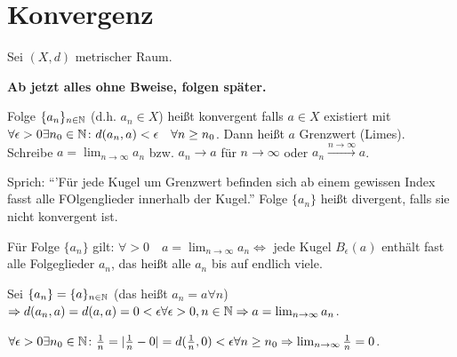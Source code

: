 \chapter{Konvergenz}
Sei $(X,d)$ metrischer Raum.

\textbf{Ab jetzt alles ohne Bweise, folgen später.}

\begin{mydef}
    Folge $\{a_n\}_{n\in\mathbb{N}}$ (d.h. $a_n \in X$) heißt konvergent falls $a\in X$ existiert mit $\forall \epsilon > 0\exists n_0 \in \mathbb{N}\colon d(a_n,a) <\epsilon \quad \forall n \geq n_0$. Dann heißt $a$ Grenzwert (Limes).\\ Schreibe $a = \lim_{n\to \infty} a_n$ bzw. $a_n \longrightarrow a$ für $n \longrightarrow \infty$ oder $a_n \overset{n \to \infty}{\longrightarrow} a$.
\end{mydef}

Sprich: ``'Für jede Kugel um Grenzwert befinden sich ab einem gewissen Index fasst alle FOlgenglieder innerhalb der Kugel.'' Folge $\{a_n\}$ heißt divergent, falls sie nicht konvergent ist.

\begin{folg}
    Für Folge $\{a_n\}$ gilt: $\forall > 0\quad a = \lim_{n\to \infty} a_n \Leftrightarrow$ jede Kugel $B_{\epsilon}(a)$ enthält fast alle Folgeglieder $a_n$, das heißt alle $a_n$ bis auf endlich viele.
\end{folg}

\begin{exmp}
    Sei $\{a_n\} = \{a\}_{n\in \mathbb{N}}$ (das heißt $a_n = a \forall n$) $\Rightarrow d(a_n,a) = d(a,a) = 0 < \epsilon \forall \epsilon > 0, n \in \mathbb{N} \Rightarrow a = \lim_{n\to \infty} a_n$.
\end{exmp}

\begin{exmp}
    
    $\forall \epsilon > 0 \exists n_0 \in \mathbb{N}\colon \frac{1}{n} = \vert \frac{1}{n} - 0 \vert = d(\frac{1}{n},0)<\epsilon \forall n \geq n_0 \Rightarrow \lim_{n\to \infty} \frac{1}{n} = 0$.
\end{exmp}